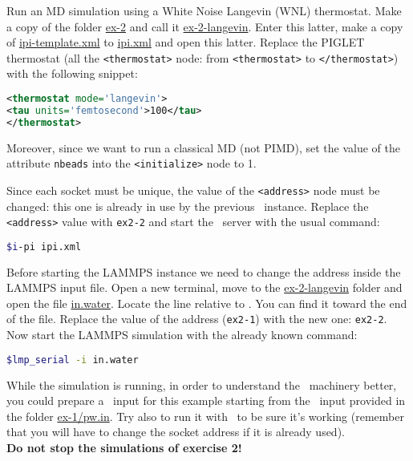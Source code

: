\documentclass{article}
\begin{document}
\begin{Exercise}[label={inputs},title={Liquid water with the
    \emph{PIGLET} thermostat}]
\Question
Run an MD simulation using a White Noise Langevin (WNL) thermostat.
Make a copy of the folder
\url{ex-2} and call it \url{ex-2-langevin}. Enter this latter, make a
copy of \url{ipi-template.xml} to \url{ipi.xml} and open this latter.
Replace the PIGLET thermostat (all the \texttt{<thermostat>} node:
from \texttt{<thermostat>} to \texttt{</thermostat>}) with the
following snippet:
\begin{lstlisting}[language=xml]
<thermostat mode='langevin'>
<tau units='femtosecond'>100</tau>
</thermostat>
\end{lstlisting}
Moreover, since we want to run a classical MD (not PIMD), set the
value of the attribute \texttt{nbeads} into the \texttt{<initialize>}
node to 1.

Since each socket must be unique, the value of the \texttt{<address>}
node must be changed: this one is already in use by the previous \ipi\
instance. Replace the \texttt{<address>} value with \texttt{ex2-2} and
start the \ipi\ server with the usual command:
\begin{lstlisting}[language=bash]
$i-pi ipi.xml
\end{lstlisting}%

Before starting the LAMMPS instance we need to change the address
inside the LAMMPS input file. Open a new terminal, move to the
\url{ex-2-langevin} folder and open the file \url{in.water}. Locate
the line relative to \ipi. You can find it toward the end of the
file. Replace the value of the address (\texttt{ex2-1}) with the new
one: \texttt{ex2-2}. Now start the LAMMPS simulation with the already
known command:
\begin{lstlisting}[language=bash]
$lmp_serial -i in.water
\end{lstlisting}%


While the simulation is running, in order to
understand the \ipi\ machinery better, you could prepare a \pwx\ input
for this example starting from the \pwx\ input provided in the folder
\url{ex-1/pw.in}. Try also to run it with \ipi\ to be sure it's
working (remember that you will have to change the socket address if
it is already used).\\
\vspace{2em}
\textbf{Do not stop the simulations of exercise 2!}



\end{Exercise}
\end{document}
